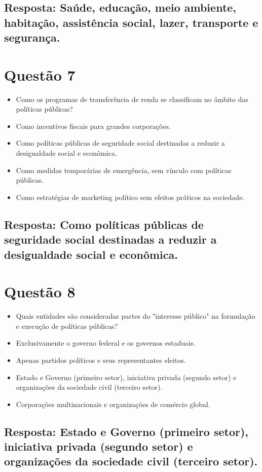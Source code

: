 \documentclass[
   article,       
   12pt,          
   oneside,       
   a4paper,       
   english,       
   brazil,        
   sumario=tradicional
   ]{abntex2}
\begin{document}
\subsection{Resposta: Saúde, educação, meio ambiente, habitação, assistência social, lazer, transporte e segurança.}

\section{Questão 7}
\begin{itemize}
    \item Como os programas de transferência de renda se classificam no âmbito das políticas públicas?
    \item Como incentivos fiscais para grandes corporações.
    \item Como políticas públicas de seguridade social destinadas a reduzir a desigualdade social e econômica.
    \item Como medidas temporárias de emergência, sem vínculo com políticas públicas.
    \item Como estratégias de marketing político sem efeitos práticos na sociedade.
\end{itemize}
\subsection{Resposta: Como políticas públicas de seguridade social destinadas a reduzir a desigualdade social e econômica.}

\section{Questão 8}
\begin{itemize}
    \item Quais entidades são consideradas partes do "interesse público" na formulação e execução de políticas públicas?
    \item Exclusivamente o governo federal e os governos estaduais.
    \item Apenas partidos políticos e seus representantes eleitos.
    \item Estado e Governo (primeiro setor), iniciativa privada (segundo setor) e organizações da sociedade civil (terceiro setor).
    \item Corporações multinacionais e organizações de comércio global.
\end{itemize}
\subsection{Resposta: Estado e Governo (primeiro setor), iniciativa privada (segundo setor) e organizações da sociedade civil (terceiro setor).}
\end{document}
